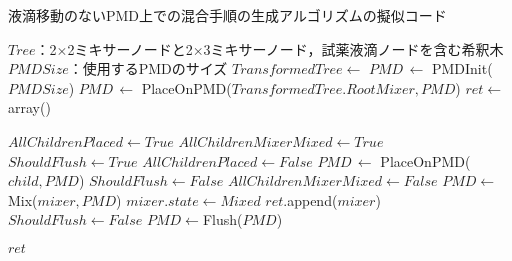 \begin{algorithm}[tbp]
 \caption{液滴移動のないPMD上での混合手順の生成アルゴリズムの擬似コード}\label{alg:genMixOrder}
 \begin{algorithmic}[1]
     \Require $\mathit{Tree}$：2$\times$2ミキサーノードと2$\times$3ミキサーノード，試薬液滴ノードを含む希釈木 
     \Require $\mathit{PMDSize}$：使用するPMDのサイズ
     \State $\mathit{TransformedTree} \gets$  
     \State $\mathit{PMD}\,\gets $  PMDInit($\mathit{PMDSize}$)
     \State $\mathit{PMD}\,\gets $  PlaceOnPMD($\mathit{TransformedTree.RootMixer,PMD}$)
     \State $\mathit{ret} \gets $array() 

    \State {}
        \State $\mathit{AllChildrenPlaced}\gets\mathit{True}$
        \State $\mathit{AllChildrenMixerMixed}\gets\mathit{True}$
        \State $\mathit{ShouldFlush}\gets\mathit{True}$
                \State$\mathit{AllChildrenPlaced \gets False}$
                \State $\mathit{PMD}\, \gets$  PlaceOnPMD($\mathit{child,PMD}$) 
                \State $\mathit{ShouldFlush}\gets\mathit{False}$
            \EndIf 
                \State $\mathit{AllChildrenMixerMixed}\gets\mathit{False}$
            \EndIf 
        \EndFor 
            \State$\mathit{PMD}\gets$Mix($\mathit{mixer,PMD}$)
            \State$\mathit{mixer.state} \gets \mathit{Mixed}$ 
            \State$\mathit{ret} $.append($\mathit{mixer}$) 
            \State $\mathit{ShouldFlush}\gets\mathit{False}$
        \EndIf
        \EndFor 
                    \State $\mathit{PMD}\gets$Flush($\mathit{PMD}$)
                \EndIf
    \EndWhile 

     \Return $\mathit{ret}$
     \EndFunction
 \end{algorithmic}
\end{algorithm}


